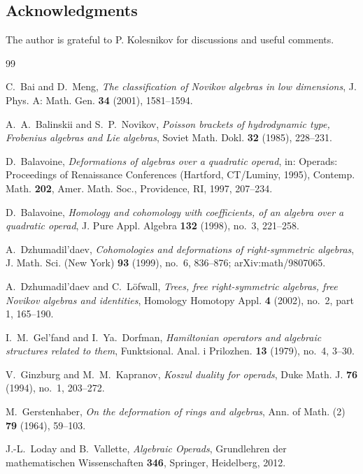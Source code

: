 \documentclass[11pt,reqno]{amsart}
\theoremstyle{plain}
\theoremstyle{definition}
\begin{document}
\subsection*{Acknowledgments}
 The author is grateful 
to P. Kolesnikov for discussions and useful comments.
\begin{thebibliography}{99}

C.~Bai and D.~Meng,
\emph{The classification of Novikov algebras in low dimensions},
J. Phys. A: Math. Gen. \textbf{34} (2001), 1581--1594.

A.~A.~Balinskii and S.~P.~Novikov,
\emph{Poisson brackets of hydrodynamic type, Frobenius algebras and Lie algebras},
Soviet Math. Dokl. \textbf{32} (1985), 228--231.

D.~Balavoine,
\emph{Deformations of algebras over a quadratic operad},
in: Operads: Proceedings of Renaissance Conferences (Hartford, CT/Luminy, 1995),
Contemp. Math. \textbf{202}, Amer. Math. Soc., Providence, RI, 1997, 207--234.

D.~Balavoine,
\emph{Homology and cohomology with coefficients, of an algebra over a quadratic operad},
J. Pure Appl. Algebra \textbf{132} (1998), no.~3, 221--258.

A.~Dzhumadil'daev,
\emph{Cohomologies and deformations of right-symmetric algebras},
J. Math. Sci. (New York) \textbf{93} (1999), no.~6, 836--876;
arXiv:math/9807065.

A.~Dzhumadil'daev and C.~L\"ofwall,
\emph{Trees, free right-symmetric algebras, free Novikov algebras and identities},
Homology Homotopy Appl. \textbf{4} (2002), no.~2, part 1, 165--190.

I.~M.~Gel'fand and I.~Ya.~Dorfman,
\emph{Hamiltonian operators and algebraic structures related to them},
Funktsional. Anal. i Prilozhen. \textbf{13} (1979), no.~4, 3--30.

V.~Ginzburg and M.~M.~Kapranov,
\emph{Koszul duality for operads},
Duke Math. J. \textbf{76} (1994), no.~1, 203--272.

M.~Gerstenhaber,
\emph{On the deformation of rings and algebras},
Ann. of Math. (2) \textbf{79} (1964), 59--103.

J.-L.~Loday and B.~Vallette,
\emph{Algebraic Operads},
Grundlehren der mathematischen Wissenschaften \textbf{346}, Springer, Heidelberg, 2012.


\end{thebibliography}
\end{document}
